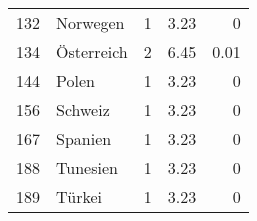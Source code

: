 \begin{longtable}{lXrrr}
     132 &
     \multicolumn{1}{X}{ Norwegen   } &


       \num{1} &
       \num[round-mode=places,round-precision=2]{3.23} &
         \num[round-mode=places,round-precision=2]{0} \\

     134 &
     \multicolumn{1}{X}{ Österreich   } &


       \num{2} &
       \num[round-mode=places,round-precision=2]{6.45} &
         \num[round-mode=places,round-precision=2]{0.01} \\

     144 &
     \multicolumn{1}{X}{ Polen   } &


       \num{1} &
       \num[round-mode=places,round-precision=2]{3.23} &
         \num[round-mode=places,round-precision=2]{0} \\

     156 &
     \multicolumn{1}{X}{ Schweiz   } &


       \num{1} &
       \num[round-mode=places,round-precision=2]{3.23} &
         \num[round-mode=places,round-precision=2]{0} \\

     167 &
     \multicolumn{1}{X}{ Spanien   } &


       \num{1} &
       \num[round-mode=places,round-precision=2]{3.23} &
         \num[round-mode=places,round-precision=2]{0} \\

     188 &
     \multicolumn{1}{X}{ Tunesien   } &


       \num{1} &
       \num[round-mode=places,round-precision=2]{3.23} &
         \num[round-mode=places,round-precision=2]{0} \\

     189 &
     \multicolumn{1}{X}{ Türkei   } &


       \num{1} &
       \num[round-mode=places,round-precision=2]{3.23} &
         \num[round-mode=places,round-precision=2]{0} \\


\end{longtable}
